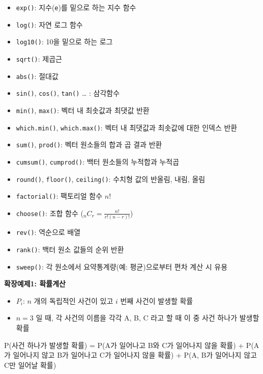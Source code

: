 \documentclass[
  11pt,
]{krantz}
\newenvironment{Shaded}{\begin{snugshade}}{\end{snugshade}}
\newcommand{\FunctionTok}[1]{\textcolor[rgb]{0,0,0}{#1}}
\newcommand{\NormalTok}[1]{#1}
\newcommand{\OtherTok}[1]{\textcolor[rgb]{0.37,0.37,0.37}{#1}}
\newcommand{\SpecialCharTok}[1]{\textcolor[rgb]{0,0,0}{#1}}
\providecommand{\tightlist}{%
  \setlength{\itemsep}{0pt}\setlength{\parskip}{0pt}}
\begin{document}
\begin{itemize}
\tightlist
\item
  \texttt{exp()}: 지수(\texttt{e})를 밑으로 하는 지수 함수
\item
  \texttt{log()}: 자연 로그 함수
\item
  \texttt{log10()}: 10을 밑으로 하는 로그
\item
  \texttt{sqrt()}: 제곱근
\item
  \texttt{abs()}: 절대값
\item
  \texttt{sin()}, \texttt{cos()}, \texttt{tan()} \ldots{} : 삼각함수
\item
  \texttt{min()}, \texttt{max()}: 벡터 내 최솟값과 최댓값 반환
\item
  \texttt{which.min()}, \texttt{which.max()}: 벡터 내 최댓값과 최솟값에 대한 인덱스 반환
\item
  \texttt{sum()}, \texttt{prod()}: 벡터 원소들의 합과 곱 결과 반환
\item
  \texttt{cumsum()}, \texttt{cumprod()}: 백터 원소들의 누적합과 누적곱
\item
  \texttt{round()}, \texttt{floor()}, \texttt{ceiling()}: 수치형 값의 반올림, 내림, 올림
\item
  \texttt{factorial()}: 팩토리얼 함수 \(n!\)
\item
  \texttt{choose()}: 조합 함수 (\(_n C_r = \frac{n!}{r!(n-r)!}\))
\item
  \texttt{rev()}: 역순으로 배열
\item
  \texttt{rank()}: 백터 원소 값들의 순위 반환
\item
  \texttt{sweep()}: 각 원소에서 요약통계량(예: 평균)으로부터 편차 계산 시 유용
\end{itemize}

\textbf{확장예제1: 확률계산}

\begin{itemize}
\tightlist
\item
  \(P_i\): \(n\) 개의 독립적인 사건이 있고 \(i\) 번째 사건이 발생할 확률
\item
  \(n = 3\) 일 때, 각 사건의 이름을 각각 A, B, C 라고 할 때 이 중 사건 하나가 발생할 확률
\end{itemize}

\footnotesize

\begin{Shaded}
\begin{Highlighting}[]
\FunctionTok{P}\NormalTok{(사건 하나가 발생할 확률) }\OtherTok{=} 
\FunctionTok{P}\NormalTok{(A가 일어나고 B와 C가 일어나지 않을 확률) }\SpecialCharTok{+} 
  \FunctionTok{P}\NormalTok{(A가 일어나지 않고 B가 일어나고 C가 일어나지 않을 확률) }\SpecialCharTok{+} 
  \FunctionTok{P}\NormalTok{(A, B가 일어나지 않고 C만 일어날 확률)}
\end{Highlighting}
\end{Shaded}
\end{document}
